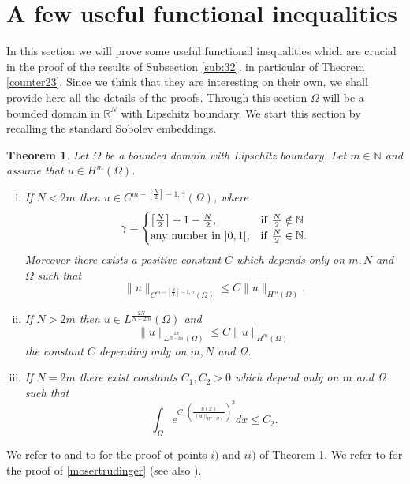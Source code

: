 \documentclass[11pt,a4paper]{amsart}
\numberwithin{equation}{section}
\newtheorem{thm}[equation]{Theorem}
\begin{document}
\section{A few useful functional inequalities}\label{app:func}

In this section we will prove some useful functional inequalities which are crucial in the proof of the results of Subsection \ref{sub:32}, in particular  of Theorem \ref{counter23}. Since we think that they are interesting on their own, we shall provide here all the details of the proofs. Through this section $\Omega$ will be a bounded domain in $\mathbb R^N$ with Lipschitz boundary. We start this section by recalling the standard Sobolev embeddings.

\begin{thm}\label{sobolev_embedding}
Let $\Omega$ be a bounded domain with Lipschitz boundary. Let $m\in\mathbb N$ and assume that $u\in H^m(\Omega)$.
\begin{enumerate}[i)]
\item If $N<2m$ then $u\in C^{m-\left[\frac{N}{2}\right]-1,\gamma}(\Omega)$, where 
\begin{equation*}
\gamma=
\begin{cases}
\left[\frac{N}{2}\right]+1-\frac{N}{2}, & {\rm if\ } \frac{N}{2}\notin\mathbb N\\
{\rm any\ number\ in\ } ]0,1[,& {\rm if\ } \frac{N}{2}\in\mathbb N.
\end{cases}
\end{equation*}
Moreover there exists a positive constant $C$ which depends only on $m,N$ and $\Omega$ such that
\begin{equation}\label{sobolev-C}
\|u\|_{C^{m-\left[\frac{N}{2}\right]-1,\gamma}(\Omega)}\leq C\|u\|_{H^m(\Omega)}.
\end{equation}
\item If $N>2m$ then $u\in L^{\frac{2N}{N-2m}}(\Omega)$ and
\begin{equation}\label{sobolev0}
 \|u\|_{L^{\frac{2N}{N-2m}}(\Omega)}\leq C\|u\|_{H^m(\Omega)}
\end{equation}
the constant $C$ depending only on $m,N$ and $\Omega$.
\item  If $N=2m$ there exist constants $C_1, C_2>0$ which depend only on $m$ and $\Omega$ such that
\begin{equation}\label{mosertrudinger}
\int_{\Omega}e^{C_1\left(\frac{u(x)}{\|u\|_{H^{m}(\Omega)}}\right)^2}dx\leq C_2.
\end{equation}
\end{enumerate}
\end{thm}
We refer to \cite[\S\,4.6-4.7]{burenkov} and to \cite[\S\,5.6.3]{evans} for the proof ot points $i)$ and $ii)$ of Theorem \ref{sobolev_embedding}. We refer to \cite[Theorem\,1.1]{cianchimosertrudinger} for the proof of \eqref{mosertrudinger} (see also \cite[\S\,4.7]{burenkov}).
\end{document}
